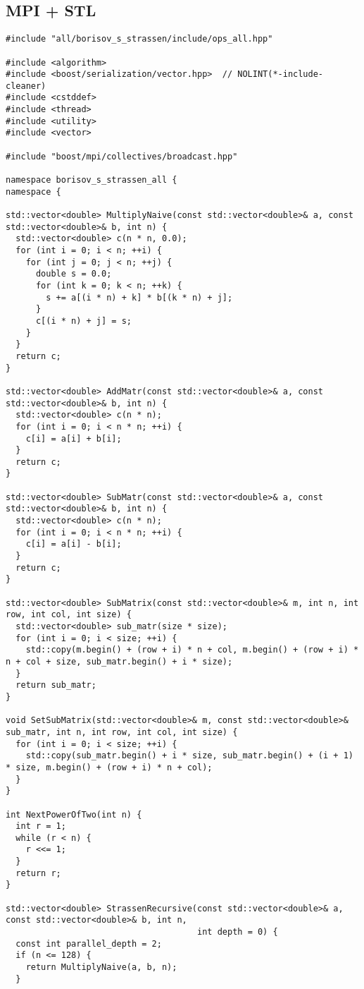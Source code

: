 \documentclass[12pt]{article}
\begin{document}
\subsection*{MPI + STL}
\begin{lstlisting}
#include "all/borisov_s_strassen/include/ops_all.hpp"

#include <algorithm>
#include <boost/serialization/vector.hpp>  // NOLINT(*-include-cleaner)
#include <cstddef>
#include <thread>
#include <utility>
#include <vector>

#include "boost/mpi/collectives/broadcast.hpp"

namespace borisov_s_strassen_all {
namespace {

std::vector<double> MultiplyNaive(const std::vector<double>& a, const std::vector<double>& b, int n) {
  std::vector<double> c(n * n, 0.0);
  for (int i = 0; i < n; ++i) {
    for (int j = 0; j < n; ++j) {
      double s = 0.0;
      for (int k = 0; k < n; ++k) {
        s += a[(i * n) + k] * b[(k * n) + j];
      }
      c[(i * n) + j] = s;
    }
  }
  return c;
}

std::vector<double> AddMatr(const std::vector<double>& a, const std::vector<double>& b, int n) {
  std::vector<double> c(n * n);
  for (int i = 0; i < n * n; ++i) {
    c[i] = a[i] + b[i];
  }
  return c;
}

std::vector<double> SubMatr(const std::vector<double>& a, const std::vector<double>& b, int n) {
  std::vector<double> c(n * n);
  for (int i = 0; i < n * n; ++i) {
    c[i] = a[i] - b[i];
  }
  return c;
}

std::vector<double> SubMatrix(const std::vector<double>& m, int n, int row, int col, int size) {
  std::vector<double> sub_matr(size * size);
  for (int i = 0; i < size; ++i) {
    std::copy(m.begin() + (row + i) * n + col, m.begin() + (row + i) * n + col + size, sub_matr.begin() + i * size);
  }
  return sub_matr;
}

void SetSubMatrix(std::vector<double>& m, const std::vector<double>& sub_matr, int n, int row, int col, int size) {
  for (int i = 0; i < size; ++i) {
    std::copy(sub_matr.begin() + i * size, sub_matr.begin() + (i + 1) * size, m.begin() + (row + i) * n + col);
  }
}

int NextPowerOfTwo(int n) {
  int r = 1;
  while (r < n) {
    r <<= 1;
  }
  return r;
}

std::vector<double> StrassenRecursive(const std::vector<double>& a, const std::vector<double>& b, int n,
                                      int depth = 0) {
  const int parallel_depth = 2;
  if (n <= 128) {
    return MultiplyNaive(a, b, n);
  }


\end{lstlisting}
\end{document}
